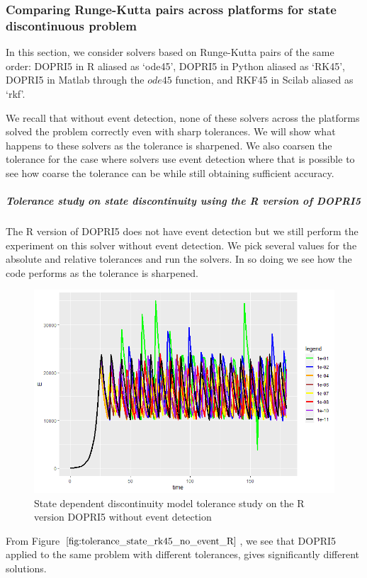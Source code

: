 \subsubsection{Comparing Runge-Kutta pairs across platforms for state discontinuous problem}
In this section, we consider solvers based on Runge-Kutta pairs of the same order: DOPRI5 in R aliased as `ode45', DOPRI5 in Python aliased as `RK45', DOPRI5 in Matlab through the $ode45$ function, and RKF45 in Scilab aliased as `rkf'.

We recall that without event detection, none of these solvers across the platforms solved the problem correctly even with sharp tolerances. We will show what happens to these solvers as the tolerance is sharpened. We also coarsen the tolerance for the case where solvers use event detection where that is possible to see how coarse the tolerance can be while still obtaining sufficient accuracy.

\subparagraph{Tolerance study on state discontinuity using the R version of DOPRI5}
The R version of DOPRI5 does not have event detection but we still perform the experiment on this solver without event detection. We pick several values for the absolute and relative tolerances and run the solvers. In so doing we see how the code performs as the tolerance is sharpened. 

\begin{figure}[h]
\centering
\includegraphics[width=0.7\linewidth]{./figures/tolerance_state_rk45_no_event_R}
\caption{State dependent discontinuity model tolerance study on the R version DOPRI5 without event detection}
\label{fig:tolerance_state_rk45_no_event_R}
\end{figure}

From Figure $\ref{fig:tolerance_state_rk45_no_event_R}$, we see that DOPRI5 applied to the same problem with different tolerances, gives significantly different solutions.

